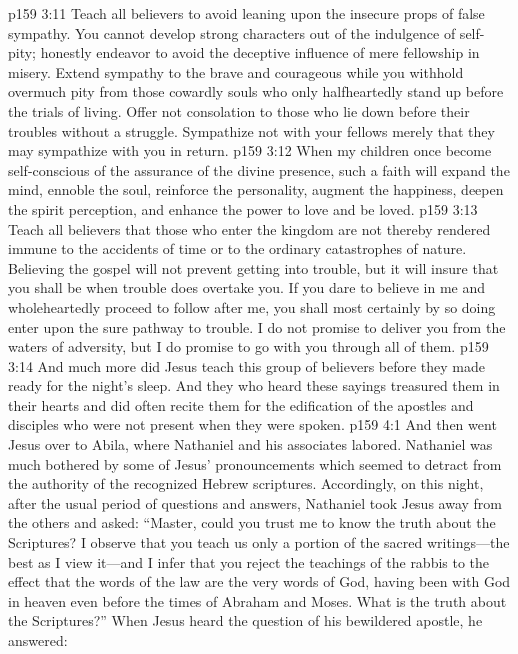 \vs p159 3:11 Teach all believers to avoid leaning upon the insecure props of false sympathy. You cannot develop strong characters out of the indulgence of self\hyp{}pity; honestly endeavor to avoid the deceptive influence of mere fellowship in misery. Extend sympathy to the brave and courageous while you withhold overmuch pity from those cowardly souls who only halfheartedly stand up before the trials of living. Offer not consolation to those who lie down before their troubles without a struggle. Sympathize not with your fellows merely that they may sympathize with you in return.
\pc \vs p159 3:12 When my children once become self\hyp{}conscious of the assurance of the divine presence, such a faith will expand the mind, ennoble the soul, reinforce the personality, augment the happiness, deepen the spirit perception, and enhance the power to love and be loved.\plusone
\vs p159 3:13 Teach all believers that those who enter the kingdom are not thereby rendered immune to the accidents of time or to the ordinary catastrophes of nature. Believing the gospel will not prevent getting into trouble, but it will insure that you shall be  when trouble does overtake you. If you dare to believe in me and wholeheartedly proceed to follow after me, you shall most certainly by so doing enter upon the sure pathway to trouble. I do not promise to deliver you from the waters of adversity, but I do promise to go with you through all of them.
\pc \vs p159 3:14 And much more did Jesus teach this group of believers before they made ready for the night’s sleep. And they who heard these sayings treasured them in their hearts and did often recite them for the edification of the apostles and disciples who were not present when they were spoken.
\vs p159 4:1 And then went Jesus over to Abila, where Nathaniel and his associates labored. Nathaniel was much bothered by some of Jesus’ pronouncements which seemed to detract from the authority of the recognized Hebrew scriptures. Accordingly, on this night, after the usual period of questions and answers, Nathaniel took Jesus away from the others and asked: “Master, could you trust me to know the truth about the Scriptures? I observe that you teach us only a portion of the sacred writings---the best as I view it---and I infer that you reject the teachings of the rabbis to the effect that the words of the law are the very words of God, having been with God in heaven even before the times of Abraham and Moses. What is the truth about the Scriptures?” When Jesus heard the question of his bewildered apostle, he answered:\plusone
